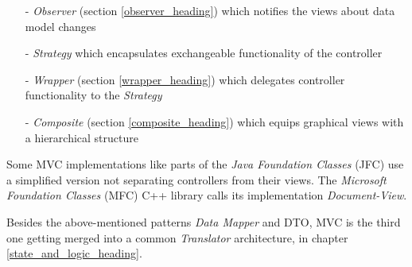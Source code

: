 \begin{itemize}
    \item[-] \emph{Observer} (section \ref{observer_heading}) which notifies
        the views about data model changes
    \item[-] \emph{Strategy} \cite{gamma1995} which encapsulates exchangeable
        functionality of the controller
    \item[-] \emph{Wrapper} (section \ref{wrapper_heading}) which delegates
        controller functionality to the \emph{Strategy}
    \item[-] \emph{Composite} (section \ref{composite_heading}) which equips
        graphical views with a hierarchical structure
\end{itemize}

Some MVC implementations like parts of the \emph{Java Foundation Classes} (JFC)
use a simplified version not separating controllers from their views. The
\emph{Microsoft Foundation Classes} (MFC) C++ library calls its implementation
\emph{Document-View}.

Besides the above-mentioned patterns \emph{Data Mapper} and DTO, MVC is the
third one getting merged into a common \emph{Translator} architecture, in
chapter \ref{state_and_logic_heading}.
